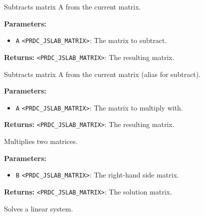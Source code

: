 \documentclass[12pt,a4paper]{article}
\begin{document}
\noindent Subtracts matrix A from the current matrix.

\vspace{5mm}
\noindent {}


\noindent \textbf{Parameters:}
\begin{itemize}
  \item \texttt{A} \texttt{<PRDC\_JSLAB\_MATRIX>}: The matrix to subtract.
\end{itemize}

\noindent \textbf{Returns:} \texttt{<PRDC\_JSLAB\_MATRIX>}: The resulting matrix.

\noindent Subtracts matrix A from the current matrix (alias for subtract).

\vspace{5mm}
\noindent {}


\noindent \textbf{Parameters:}
\begin{itemize}
  \item \texttt{A} \texttt{<PRDC\_JSLAB\_MATRIX>}: The matrix to multiply with.
\end{itemize}

\noindent \textbf{Returns:} \texttt{<PRDC\_JSLAB\_MATRIX>}: The resulting matrix.

\noindent Multiplies two matrices.

\vspace{5mm}
\noindent {}


\noindent \textbf{Parameters:}
\begin{itemize}
  \item \texttt{B} \texttt{<PRDC\_JSLAB\_MATRIX>}: The right-hand side matrix.
\end{itemize}

\noindent \textbf{Returns:} \texttt{<PRDC\_JSLAB\_MATRIX>}: The solution matrix.

\noindent Solves a linear system.

\vspace{5mm}
\noindent {}
\end{document}
